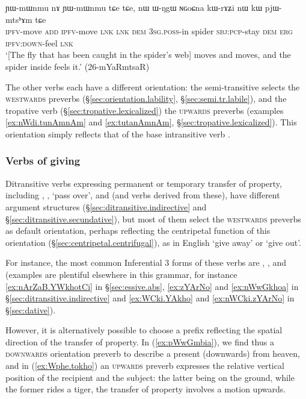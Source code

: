 \begin{exe}
\ex \label{ex:NGoCna.nWkW.pjWmtshAm}
\gll ɲɯ-mɯnmu nɤ ɲɯ-mɯnmu tɕe tɕe, nɯ ɯ-ŋgɯ ɴɢoɕna kɯ-rɤʑi nɯ kɯ pjɯ-mtsʰɤm tɕe  \\
\textsc{ipfv}-move \textsc{add} \textsc{ipfv}-move  \textsc{lnk} \textsc{lnk} \textsc{dem} \textsc{3sg}.\textsc{poss}-in spider \textsc{sbj}:\textsc{pcp}-stay \textsc{dem} \textsc{erg} \textsc{ipfv}:\textsc{down}-feel \textsc{lnk} \\
\glt `[The fly that has been caught in the spider's web] moves and moves, and the spider inside feels it.' (26-mYaRmtsaR)
\end{exe}

The other verbs each have a different orientation: the semi-transitive  selects the \textsc{westwards} preverbs (§\ref{sec:orientation.lability}, §\ref{sec:semi.tr.labile}), and the tropative verb  (§\ref{sec:tropative.lexicalized}) the \textsc{upwards} preverbs (examples \ref{ex:nWdi.tunAmnAm} and \ref{ex:tutanAmnAm}, §\ref{sec:tropative.lexicalized}). This orientation simply reflects that of the base intransitive verb .

\subsubsection{Verbs of giving} \label{sec:preverb.giving}
Ditransitive verbs expressing permanent or temporary transfer of property, including ,  , `pass over',  and  (and verbs derived from these), have different argument structures (§\ref{sec:ditransitive.indirective} and §\ref{sec:ditransitive.secundative}), but most of them select the \textsc{westwards} preverbs as default orientation, perhaps reflecting the centripetal function of this orientation (§\ref{sec:centripetal.centrifugal}), as in English `give away' or `give out'.

For instance, the most common Inferential 3\flobv{} forms of these verbs are , ,  and  (examples are plentiful elsewhere in this grammar, for instance \ref{ex:nArZaB.YWkhotCi} in §\ref{sec:essive.abs}, \ref{ex:zYArNo} and \ref{ex:nWwGkhoa} in §\ref{sec:ditransitive.indirective} and \ref{ex:WCki.YAkho} and \ref{ex:nWCki.zYArNo} in §\ref{sec:dative}). 
 
However, it is alternatively possible to choose a prefix reflecting the spatial direction of the transfer of property. In (\ref{ex:pWwGmbia}), we find thus a \textsc{downwards} orientation preverb to describe a present (downwards) from heaven, and in (\ref{ex:Wphe.tokho}) an \textsc{upwards} preverb expresses the relative vertical position of the recipient and the subject: the latter being on the ground, while the former rides a tiger, the transfer of property involves a motion upwards.
 
